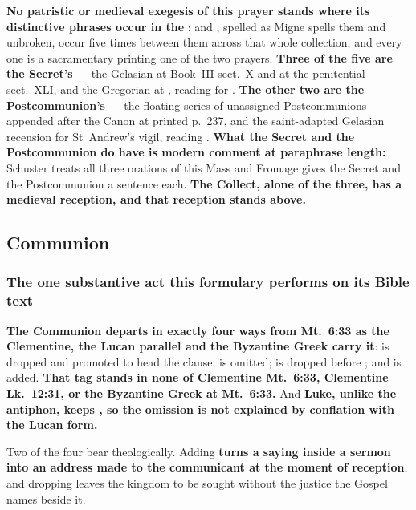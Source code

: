 \textbf{No patristic or medieval exegesis of this prayer stands where its
distinctive phrases occur in the }:  and , spelled as Migne spells
them and unbroken, occur five times between them across that whole collection, and every one is a sacramentary printing one of the two prayers.
\textbf{Three of the five are the Secret's} --- the Gelasian at Book~III
sect.~X and at the penitential sect.~XLI, and the Gregorian at , reading  for
. \textbf{The other two are the Postcommunion's} --- the
floating series of unassigned Postcommunions appended after the Canon at printed
p.~237, and the saint-adapted Gelasian recension for St~Andrew's vigil, reading
. \textbf{What the Secret and the Postcommunion do have is
modern comment at paraphrase length:}
Schuster treats all three orations of this Mass and Fromage gives the Secret
and the Postcommunion a sentence each. \textbf{The Collect, alone of the three,
has a medieval reception, and that reception stands above.}

\elementguard
\subsection*{Communion }


\subsubsection*{The one substantive act this formulary performs on its Bible text}

\textbf{The Communion departs in exactly four ways from Mt.\ 6:33 as the
Clementine, the Lucan parallel and the Byzantine Greek carry it}: 
is dropped and  promoted to head the clause;  is omitted;  is dropped before ; and  is added. \textbf{That tag stands in none of Clementine Mt.\ 6:33,
Clementine Lk.\ 12:31, or the Byzantine Greek at Mt.\ 6:33.} And \textbf{Luke,
unlike the antiphon, keeps , so the omission is not
explained by conflation with the Lucan form.}

Two of the four bear theologically. Adding  \textbf{turns a
saying inside a sermon into an address made to the communicant at the moment of
reception}; and dropping  leaves the kingdom to be
sought without the justice the Gospel names beside it.

